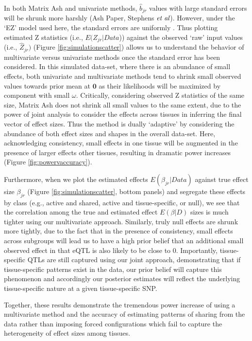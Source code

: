In both Matrix Ash and univariate methods, $\hat{b}_{jr}$ values with large standard errors will be shrunk more harshly (Ash Paper, Stephens $\emph{et al}$). However, under the `EZ' model used here, the standard errors are uniformly . Thus plotting estimated Z statistics (i.e., $E(Z_{jr}|Data$)) against the observed `raw' input values (i.e., $\hat{Z}_{jr})$ (Figure \ref{fig:simulationscatter}) allows us to understand the behavior of multivariate versus univariate methods once the standard error has been considered. In this simulated data-set, where there is an abundance of small effects, both univariate and multivariate methods tend to shrink small observed values towards prior mean at $\bm{0}$ as their likelihoods will be maximized by component with small $\omega$. Critically, considering observed Z statistics of the same size, Matrix Ash does not shrink all small values to the same extent, due to the power of joint analysis to consider the effects across tissues in inferring the final vector of effect sizes. Thus the method is dually `adaptive' by considering the abundance of both effect sizes and shapes in the overall data-set.  Here, acknowledging consistency, small effects in one tissue will be augmented in the presence of larger effects  other tissues, resulting in dramatic power increases (Figure \ref{fig:powervaccuracy}).

Furthermore, when we plot the estimated effects $E(\beta_{jr}|Data)$ against true effect size $\beta_{jr}$ (Figure \ref{fig:simulationscatter}, bottom panels) and segregate these effects by class  (e.g., active and shared, active and tissue-specific, or null), we see that the correlation among the true and estimated effect $E(\beta|D)$ sizes is much tighter using our multivariate approach. Similarly, truly null effects are shrunk more tightly, due to the fact that in the presence of consistency, small effects across subgroups will lead us to have a high prior belief that an additional small observed effect in that eQTL is also likely to be close to 0. Importantly, tissue-specific QTLs are still captured using our joint approach, demonstrating that if tissue-specific patterns exist in the data, our prior belief will capture this phenomenon and accordingly our posterior estimates will reflect the underlying tissue-specific nature at a given tissue-specific SNP.

Together, these results demonstrate the tremendous power increase of using a multivariate method and the accuracy of estimating patterns of sharing from the data rather than imposing forced configurations which fail to capture the heterogeneity of effect sizes among tissues.


